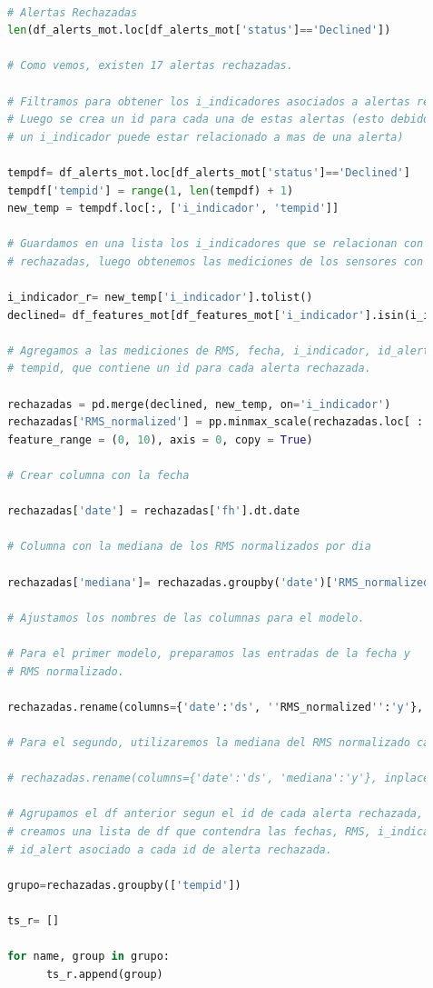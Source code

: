 \documentclass{article}[14pts]
\begin{document}
    \begin{lstlisting}[language=Python]

      # Alertas Rechazadas
      len(df_alerts_mot.loc[df_alerts_mot['status']=='Declined'])

      # Como vemos, existen 17 alertas rechazadas.

      # Filtramos para obtener los i_indicadores asociados a alertas rechazadas.
      # Luego se crea un id para cada una de estas alertas (esto debido a que 
      # un i_indicador puede estar relacionado a mas de una alerta)

      tempdf= df_alerts_mot.loc[df_alerts_mot['status']=='Declined']
      tempdf['tempid'] = range(1, len(tempdf) + 1)
      new_temp = tempdf.loc[:, ['i_indicador', 'tempid']]

      # Guardamos en una lista los i_indicadores que se relacionan con alertas 
      # rechazadas, luego obtenemos las mediciones de los sensores con sus fechas. 

      i_indicador_r= new_temp['i_indicador'].tolist()
      declined= df_features_mot[df_features_mot['i_indicador'].isin(i_indicador_r)]

      # Agregamos a las mediciones de RMS, fecha, i_indicador, id_alerta la columna 
      # tempid, que contiene un id para cada alerta rechazada.

      rechazadas = pd.merge(declined, new_temp, on='i_indicador')
      rechazadas['RMS_normalized'] = pp.minmax_scale(rechazadas.loc[ : , 'RMS'], 
      feature_range = (0, 10), axis = 0, copy = True)

      # Crear columna con la fecha

      rechazadas['date'] = rechazadas['fh'].dt.date

      # Columna con la mediana de los RMS normalizados por dia 
      
      rechazadas['mediana']= rechazadas.groupby('date')['RMS_normalized']

      # Ajustamos los nombres de las columnas para el modelo.

      # Para el primer modelo, preparamos las entradas de la fecha y 
      # RMS normalizado.

      rechazadas.rename(columns={'date':'ds', ''RMS_normalized'':'y'}, inplace=True)
      
      # Para el segundo, utilizaremos la mediana del RMS normalizado calculada diariamente.

      # rechazadas.rename(columns={'date':'ds', 'mediana':'y'}, inplace=True)

      # Agrupamos el df anterior segun el id de cada alerta rechazada, luego  
      # creamos una lista de df que contendra las fechas, RMS, i_indicador,  
      # id_alert asociado a cada id de alerta rechazada.

      grupo=rechazadas.groupby(['tempid'])

      ts_r= []

      for name, group in grupo:
            ts_r.append(group)
    \end{lstlisting}
\end{document}
